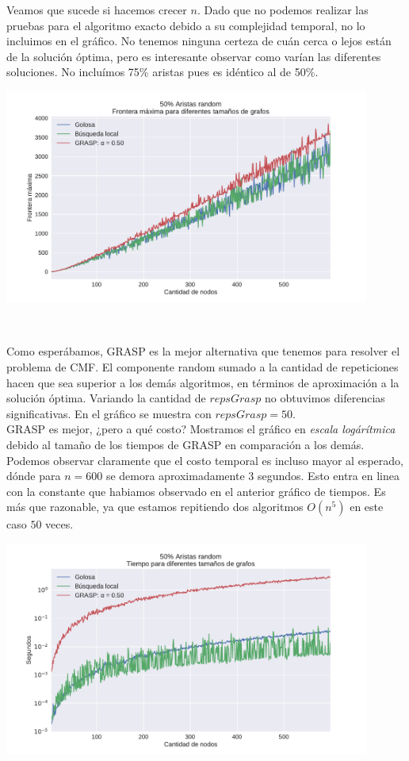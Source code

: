 Veamos que sucede si hacemos crecer $n$. Dado que no podemos realizar las pruebas para el algoritmo exacto debido a su complejidad temporal, no lo incluimos en el gráfico. No tenemos ninguna certeza de cuán cerca o lejos están de la solución óptima, pero es interesante observar como varían las diferentes soluciones. No incluímos 75\% aristas pues es idéntico al de 50\%. \\

{\centering
    \includegraphics[width=0.9\textwidth]{informe/imgs/exp_random50_frontera_todos_ngrande.pdf}
    
}
$ $ \newline

Como esperábamos, GRASP es la mejor alternativa que tenemos para resolver el problema de CMF. El componente random sumado a la cantidad de repeticiones hacen que sea superior a los demás algoritmos, en términos de aproximación a la solución óptima. Variando la cantidad de $repsGrasp$ no obtuvimos diferencias significativas. En el gráfico se muestra con $repsGrasp = 50$. \\

GRASP es mejor, ¿pero a qué costo? Mostramos el gráfico en \textit{escala logárítmica} debido al tamaño de los tiempos de GRASP en comparación a los demás. Podemos observar claramente que el costo temporal es incluso mayor al esperado, dónde para $n = 600$ se demora aproximadamente 3 segundos. Esto entra en linea con la constante que habiamos observado en el anterior gráfico de tiempos. Es más que razonable, ya que estamos repitiendo dos algoritmos $O(n^5)$ en este caso $50$ veces. \\

{\centering
    \includegraphics[width=0.9\textwidth]{informe/imgs/exp_random50_tiempo_todos_ngrande_logy.pdf}
    
}
$ $ \newline

